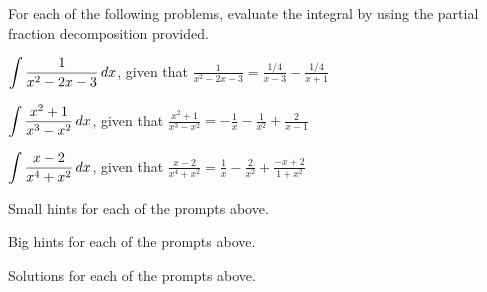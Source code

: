 \begin{activity} \label{A:5.5.1} For each of the following problems, evaluate the integral by using the partial fraction decomposition provided.

\ba
	\item $\displaystyle \int \frac{1}{x^2 - 2x - 3} \, dx$, \hfill given that $\frac{1}{x^2 - 2x - 3} = \frac{1/4}{x-3} - \frac{1/4}{x+1}$
	
	\item $\displaystyle \int \frac{x^2+1}{x^3 - x^2} \, dx$, \hfill given that $\frac{x^2+1}{x^3 - x^2} = -\frac{1}{x} - \frac{1}{x^2} + \frac{2}{x-1}$
	
	\item $\displaystyle \int \frac{x-2}{x^4 + x^2}\, dx$, \hfill given that $\frac{x-2}{x^4 + x^2} = \frac{1}{x} - \frac{2}{x^2} + \frac{-x+2}{1+x^2}$
	
\ea

\end{activity}
\begin{smallhint}
\ba
	\item Small hints for each of the prompts above.
\ea
\end{smallhint}
\begin{bighint}
\ba
	\item Big hints for each of the prompts above.
\ea
\end{bighint}
\begin{activitySolution}
\ba
	\item Solutions for each of the prompts above.
\ea
\end{activitySolution}
\aftera